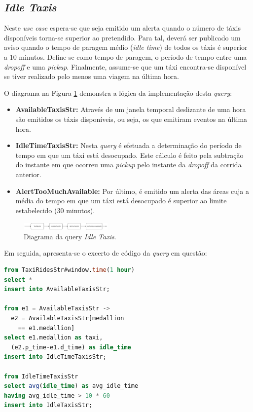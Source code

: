 \documentclass[article]{IEEEtran}
\begin{document}
\subsection{\textit{Idle Taxis}}

Neste \textit{use case} espera-se que seja emitido um alerta quando o número de táxis disponíveis torna-se superior ao pretendido. Para tal, deverá ser publicado um aviso quando o tempo de paragem médio (\textit{idle time}) de todos os táxis é superior a 10 minutos. Define-se como tempo de paragem, o período de tempo entre uma \textit{dropoff} e uma \textit{pickup}. Finalmente, assume-se que um táxi encontra-se disponível se tiver realizado pelo menos uma viagem na última hora.

O diagrama na Figura \ref{fig:idleTaxisDiagram} demonstra a lógica da implementação desta \textit{query}:
\begin{itemize}
    \item \textbf{AvailableTaxisStr:} Através de um janela temporal deslizante de uma hora são emitidos os táxis disponíveis, ou seja, os que emitiram eventos na última hora.
    \item \textbf{IdleTimeTaxisStr:} Nesta \textit{query} é efetuada a determinação do período de tempo em que um táxi está desocupado. Este cálculo é feito pela subtração do instante em que ocorreu uma \textit{pickup} pelo instante da \textit{dropoff} da corrida anterior.
    \item \textbf{AlertTooMuchAvailable:} Por último, é emitido um alerta das áreas cuja a média do tempo em que um táxi está desocupado é superior ao limite estabelecido (30 minutos).
\end{itemize}

\begin{figure}[hbtp]
    \centering
        \includegraphics[width=0.4\textwidth]{images/idleTime.png}
    \caption{Diagrama da query \textit{Idle Taxis}.}
    \label{fig:idleTaxisDiagram}
\end{figure}

Em seguida, apresenta-se o excerto de código da \textit{query} em questão:
\begin{lstlisting}[language=SQL]
from TaxiRidesStr#window.time(1 hour)
select *
insert into AvailableTaxisStr;

from e1 = AvailableTaxisStr -> 
  e2 = AvailableTaxisStr[medallion
    == e1.medallion]
select e1.medallion as taxi,
  (e2.p_time-e1.d_time) as idle_time
insert into IdleTimeTaxisStr;

from IdleTimeTaxisStr
select avg(idle_time) as avg_idle_time
having avg_idle_time > 10 * 60
insert into IdleTaxisStr;
\end{lstlisting}
\end{document}
